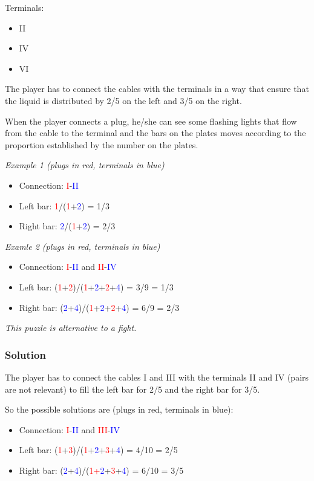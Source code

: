 Terminals:
\begin{itemize}
	\item II
	\item IV
	\item VI
\end{itemize}

The player has to connect the cables with the terminals in a way that ensure that the liquid is distributed by 2/5 on the left and 3/5 on the right.

When the player connects a plug, he/she can see some flashing lights that flow from the cable to the terminal and the bars on the plates moves according to the proportion established by the number on the plates.

\textit{Example 1 (plugs in red, terminals in blue)}
\begin{itemize}
	\item Connection: \textcolor{red}{I}-\textcolor{blue}{II}
	\item Left bar: \textcolor{red}{1}/(\textcolor{red}{1}+\textcolor{blue}{2}) = 1/3
	\item Right bar: \textcolor{blue}{2}/(\textcolor{red}{1}+\textcolor{blue}{2}) = 2/3
\end{itemize}

\textit{Examle 2 (plugs in red, terminals in blue)}
\begin{itemize}
	\item Connection: \textcolor{red}{I}-\textcolor{blue}{II} and \textcolor{red}{II}-\textcolor{blue}{IV}
	\item Left bar: (\textcolor{red}{1}+\textcolor{red}{2})/(\textcolor{red}{1}+\textcolor{blue}{2}+\textcolor{red}{2}+\textcolor{blue}{4}) = 3/9 = 1/3
	\item Right bar: (\textcolor{blue}{2}+\textcolor{blue}{4})/(\textcolor{red}{1}+\textcolor{blue}{2}+\textcolor{red}{2}+\textcolor{blue}{4}) = 6/9 = 2/3
\end{itemize}

\textit{This puzzle is alternative to a fight.}

\subsubsection*{Solution}
The player has to connect the cables I and III with the terminals II and IV (pairs are not relevant) to fill the left bar for 2/5 and the right bar for 3/5.

So the possible solutions are (plugs in red, terminals in blue):
\begin{itemize}
	\item Connection: \textcolor{red}{I}-\textcolor{blue}{II} and \textcolor{red}{III}-\textcolor{blue}{IV}
	\item Left bar: (\textcolor{red}{1}+\textcolor{red}{3})/(\textcolor{red}{1}+\textcolor{blue}{2}+\textcolor{red}{3}+\textcolor{blue}{4}) = 4/10 = 2/5
	\item Right bar: (\textcolor{blue}{2}+\textcolor{blue}{4})/(\textcolor{red}{1+\textcolor{blue}{2}}+\textcolor{red}{3}+\textcolor{blue}{4}) = 6/10 = 3/5
\end{itemize}

